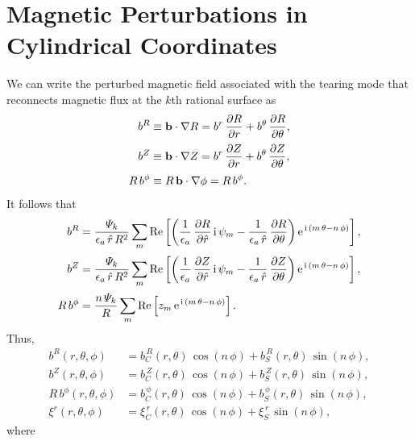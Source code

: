 \documentclass[12pt,prb,aps,notitlepage]{revtex4-1}
\begin{document}
\section{Magnetic Perturbations in Cylindrical Coordinates}
We can write the perturbed magnetic field associated with the tearing mode that reconnects magnetic flux at the $k$th rational surface as
\begin{align}
b^R &\equiv {\bf b}\cdot\nabla R = b^r\,\frac{\partial R}{\partial r}+ b^\theta\,\frac{\partial R}{\partial\theta},\\[0.5ex]
b^Z &\equiv {\bf b}\cdot\nabla Z = b^r\,\frac{\partial Z}{\partial r}+ b^\theta\,\frac{\partial Z}{\partial\theta},\\[0.5ex]
R\,b^\phi&\equiv R\,{\bf b}\cdot\nabla\phi = R\,b^\phi.
\end{align}
It follows that
\begin{align}
b^R&= \frac{{\mit\Psi}_k}{\epsilon_a\,\hat{r}\,R^2}\sum_m{\rm Re}\left[\left(\frac{1}{\epsilon_a}\,\frac{\partial R}{\partial\hat{r}}\,{\rm i}\,\psi_m - \frac{1}{\epsilon_a\,\hat{r}}\,\frac{\partial R}{\partial \theta}\right){\rm e}^{\,{\rm i}\,(m\,\theta-n\,\phi)}\right],\\[0.5ex]
b^Z&= \frac{{\mit\Psi}_k}{\epsilon_a\,\hat{r}\,R^2}\sum_m{\rm Re}\left[\left(\frac{1}{\epsilon_a}\,\frac{\partial Z}{\partial\hat{r}}\,{\rm i}\,\psi_m - \frac{1}{\epsilon_a\,\hat{r}}\,\frac{\partial Z}{\partial \theta}\right){\rm e}^{\,{\rm i}\,(m\,\theta-n\,\phi)}\right],\\[0.5ex]
R\,b^\phi &= \frac{n\,{\mit\Psi}_k}{R}\sum_m {\rm Re}\left[z_m\,{\rm e}^{\,{\rm i}\,(m\,\theta-n\,\phi)}\right].
\end{align}
Thus,
\begin{align}
b^R(r,\theta,\phi) &= b^{\,R}_C(r,\theta)\,\cos(n\,\phi) + b_S^{\,R}(r,\theta)\,\sin(n\,\phi),\\[0.5ex]
b^Z(r,\theta,\phi) &= b^{\,Z}_C(r,\theta)\,\cos(n\,\phi) + b_S^{\,Z}(r,\theta)\,\sin(n\,\phi),\\[0.5ex]
R\,b^\phi(r,\theta,\phi) &= b^{\,\phi}_C(r,\theta)\,\cos(n\,\phi) + b_S^{\,\phi}(r,\theta)\,\sin(n\,\phi),\\[0.5ex]\xi^r(r,\theta,\phi)&= \xi^{\,r}_{C}(r,\theta)\,\cos(n\,\phi) + \xi^{\,r}_{S}\,\sin(n\,\phi),
\end{align}
where
\end{document}
